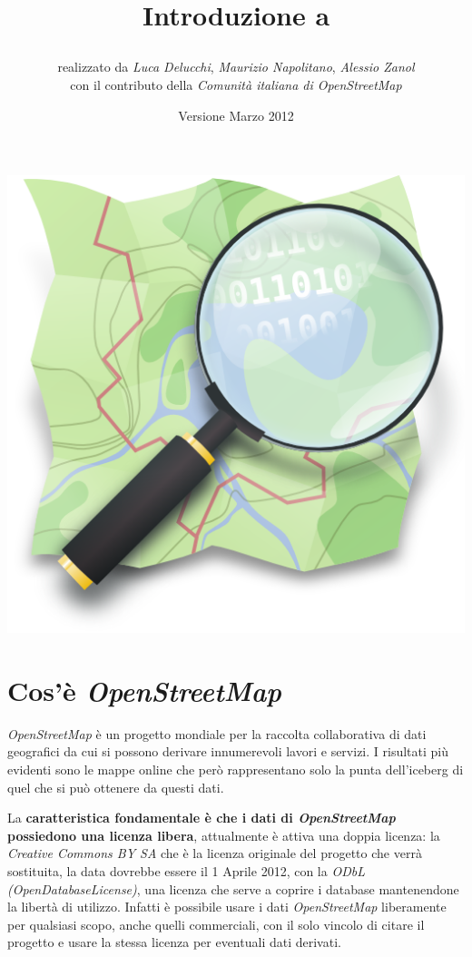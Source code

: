 \documentclass[a4paper,twoside,12pt,]{article}
\title{\begin{Large}\textbf{Introduzione a \osm}\end{Large}}
\date{\small{Versione Marzo 2012}}
\author{realizzato da \textit{Luca Delucchi}, \textit{Maurizio Napolitano}, \textit{Alessio Zanol} \\ con il contributo della \textit{Comunità italiana di OpenStreetMap}}
\newcommand{\osm}{\emph{OpenStreetMap}\xspace}
\newcommand{\pro}[1]{\emph{#1}}
\begin{document}
\maketitle
\begin{center}
\includegraphics{osm_logo_new.png}
\end{center}
\setlength{\cftbeforesecskip}{0.1em}
\setcounter{tocdepth}{1}
\setcounter{secnumdepth}{0}
\tableofcontents
\newpage

\section{Cos'è \osm}
\osm è un progetto mondiale per la raccolta collaborativa di dati geografici da cui si possono derivare innumerevoli lavori e servizi. I risultati più evidenti sono le mappe online che però rappresentano solo la punta dell'iceberg di quel che si può ottenere da questi dati.

La \textbf{caratteristica fondamentale è che i dati di \osm possiedono una licenza libera}, attualmente è attiva una doppia licenza: la \pro{Creative Commons BY SA} che è la licenza originale del progetto che verrà sostituita, la data dovrebbe essere il 1 Aprile 2012, con la \pro{ODbL (OpenDatabaseLicense)}, una licenza che serve a coprire i database mantenendone la libertà di utilizzo. Infatti è possibile usare i dati \osm liberamente per qualsiasi scopo, anche quelli commerciali, con il solo vincolo di citare il progetto e usare la stessa licenza per eventuali dati derivati. 
\end{document}
